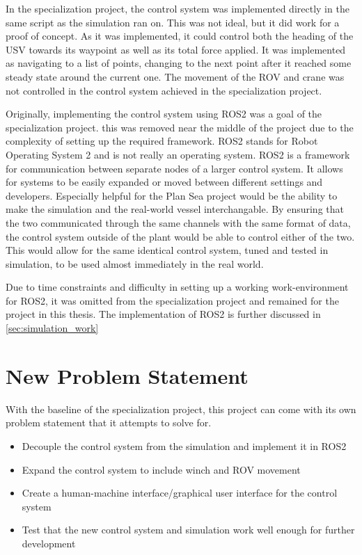 \documentclass[class=article, crop=false, draft=true]{standalone}
\begin{document}
In the specialization project, the control system was implemented directly in the same script as the simulation ran on. This was not ideal, but it did work for a proof of concept. As it was implemented, it could control both the heading of the USV towards its waypoint as well as its total force applied. It was implemented as navigating to a list of points, changing to the next point after it reached some steady state around the current one. The movement of the ROV and crane was not controlled in the control system achieved in the specialization project.

Originally, implementing the control system using ROS2 was a goal of the specialization project. this was removed near the middle of the project due to the complexity of setting up the required framework. ROS2 stands for Robot Operating System 2 and is not really an operating system. ROS2 is a framework for communication between separate nodes of a larger control system. It allows for systems to be easily expanded or moved between different settings and developers. Especially helpful for the Plan Sea project would be the ability to make the simulation and the real-world vessel interchangable. By ensuring that the two communicated through the same channels with the same format of data, the control system outside of the plant would be able to control either of the two. This would allow for the same identical control system, tuned and tested in simulation, to be used almost immediately in the real world.

Due to time constraints and difficulty in setting up a working work-environment for ROS2, it was omitted from the specialization project and remained for the project in this thesis. The implementation of ROS2 is further discussed in \cref{sec:simulation_work}

\section{New Problem Statement}
\label{sec:problem_statement}
With the baseline of the specialization project, this project can come with its own problem statement that it attempts to solve for.

\begin{itemize}
\item Decouple the control system from the simulation and implement it in ROS2
\item Expand the control system to include winch and ROV movement
\item Create a human-machine interface/graphical user interface for the control system
\item Test that the new control system and simulation work well enough for further development
\end{itemize}
\end{document}
